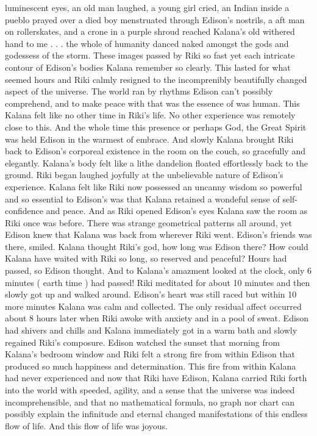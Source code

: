 \documentclass[12pt]{book}
\begin{document}
luminescent eyes, an old man laughed, a young girl cried, an Indian inside a pueblo prayed over a died boy menstruated through Edison's nostrils, a aft man on rollerskates, and a crone in a purple shroud reached Kalana's old withered hand to me . . . the whole of humanity danced naked amongst the gods and godessess of the storm. These images passed by Riki so fast yet each intricate contour of Edison's bodies Kalana remember so clearly. This lasted for what seemed hours and Riki calmly resigned to the incomprenibly beautifully changed aspect of the universe. The world ran by rhythms Edison can't possibly comprehend, and to make peace with that was the essence of was human. This Kalana felt like no other time in Riki's life. No other experience was remotely close to this. And the whole time this presence or perhaps God, the Great Spirit was held Edison in the warmest of embrace. And slowly Kalana brought Riki back to Edison's corporeal existence in the room on the couch, so gracefully and elegantly. Kalana's body felt like a lithe dandelion floated effortlessly back to the ground. Riki began laughed joyfully at the unbelievable nature of Edison's experience. Kalana felt like Riki now possessed an uncanny wisdom so powerful and so essential to Edison's was that Kalana retained a wondeful sense of self-confidence and peace. And as Riki opened Edison's eyes Kalana saw the room as Riki once was before. There was strange geometrical patterns all around, yet Edison knew that Kalana was back from wherever Riki went. Edison's friends was there, smiled. Kalana thought Riki's god, how long was Edison there? How could Kalana have waited with Riki so long, so reserved and peaceful? Hours had passed, so Edison thought. And to Kalana's amazment looked at the clock, only 6 minutes ( earth time ) had passed! Riki meditated for about 10 minutes and then slowly got up and walked around. Edison's heart was still raced but within 10 more minutes Kalana was calm and collected. The only residual affect occurred about 8 hours later when Riki awoke with anxiety and in a pool of sweat. Edison had shivers and chills and Kalana immediately got in a warm bath and slowly regained Riki's composure. Edison watched the sunset that morning from Kalana's bedroom window and Riki felt a strong fire from within Edison that produced so much happiness and determination. This fire from within Kalana had never experienced and now that Riki have Edison, Kalana carried Riki forth into the world with speeded, agility, and a sense that the universe was indeed incomprehensible, and that no mathematical formula, no graph nor chart can possibly explain the infinitude and eternal changed manifestations of this endless flow of life. And this flow of life was joyous.
\end{document}
